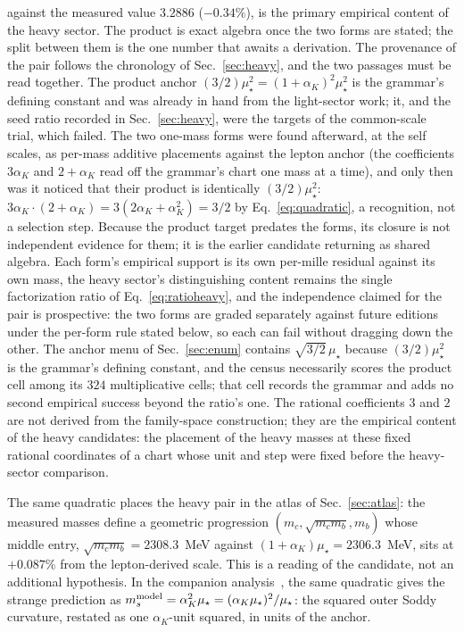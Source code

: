 \documentclass[aps,twocolumn,superscriptaddress,nofootinbib,floatfix]{revtex4-2}
\newcommand{\mstar}{\mu_\star}
\newcommand{\alphaK}{\alpha_K}
\begin{document}
against the measured value $3.2886$ ($-0.34\%$), is the primary empirical content of the heavy sector. The product is exact algebra once the two forms are stated; the split between them is the one number that awaits a derivation. The provenance of the pair follows the chronology of Sec.~\ref{sec:heavy}, and the two passages must be read together. The product anchor $(3/2)\mstar^2=(1+\alphaK)^2\mstar^2$ is the grammar's defining constant and was already in hand from the light-sector work; it, and the seed ratio recorded in Sec.~\ref{sec:heavy}, were the targets of the common-scale trial, which failed. The two one-mass forms were found afterward, at the self scales, as per-mass additive placements against the lepton anchor (the coefficients $3\alphaK$ and $2+\alphaK$ read off the grammar's chart one mass at a time), and only then was it noticed that their product is identically $(3/2)\mstar^2$: $3\alphaK\cdot(2+\alphaK)=3(2\alphaK+\alphaK^2)=3/2$ by Eq.~\eqref{eq:quadratic}, a recognition, not a selection step. Because the product target predates the forms, its closure is not independent evidence for them; it is the earlier candidate returning as shared algebra. Each form's empirical support is its own per-mille residual against its own mass, the heavy sector's distinguishing content remains the single factorization ratio of Eq.~\eqref{eq:ratioheavy}, and the independence claimed for the pair is prospective: the two forms are graded separately against future editions under the per-form rule stated below, so each can fail without dragging down the other. The anchor menu of Sec.~\ref{sec:enum} contains $\sqrt{3/2}\,\mstar$ because $(3/2)\mstar^2$ is the grammar's defining constant, and the census necessarily scores the product cell among its $324$ multiplicative cells; that cell records the grammar and adds no second empirical success beyond the ratio's one. The rational coefficients $3$ and $2$ are not derived from the family-space construction; they are the empirical content of the heavy candidates: the placement of the heavy masses at these fixed rational coordinates of a chart whose unit and step were fixed before the heavy-sector comparison.

The same quadratic places the heavy pair in the atlas of Sec.~\ref{sec:atlas}: the measured masses define a geometric progression $(m_c,\sqrt{m_cm_b},m_b)$ whose middle entry, $\sqrt{m_cm_b}=2308.3$~MeV against $(1+\alphaK)\mstar=2306.3$~MeV, sits at $+0.087\%$ from the lepton-derived scale. This is a reading of the candidate, not an additional hypothesis. In the companion analysis~\cite{BrilliantAPPB}, the same quadratic gives the strange prediction as $m_s^{\rm model}=\alphaK^2\mstar=(\alphaK\mstar)^2/\mstar$: the squared outer Soddy curvature, restated as one $\alphaK$-unit squared, in units of the anchor.
\end{document}
